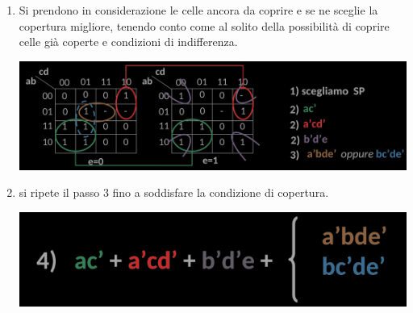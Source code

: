 \documentclass{article}
\begin{document}
\begin{enumerate}
\begin{center}
    \end{center}
    \item Si prendono in considerazione le celle ancora da coprire e se ne sceglie la copertura migliore, tenendo conto come al solito della possibilità di coprire celle già coperte e condizioni di indifferenza.
    \begin{center}
        \includegraphics[scale=0.55]{indes3}
    \end{center}
    \item si ripete il passo 3 fino a soddisfare la condizione di copertura.
    \begin{center}
    \includegraphics[scale=0.55]{ind4}
    \end{center}
\end{enumerate}
\end{document}
